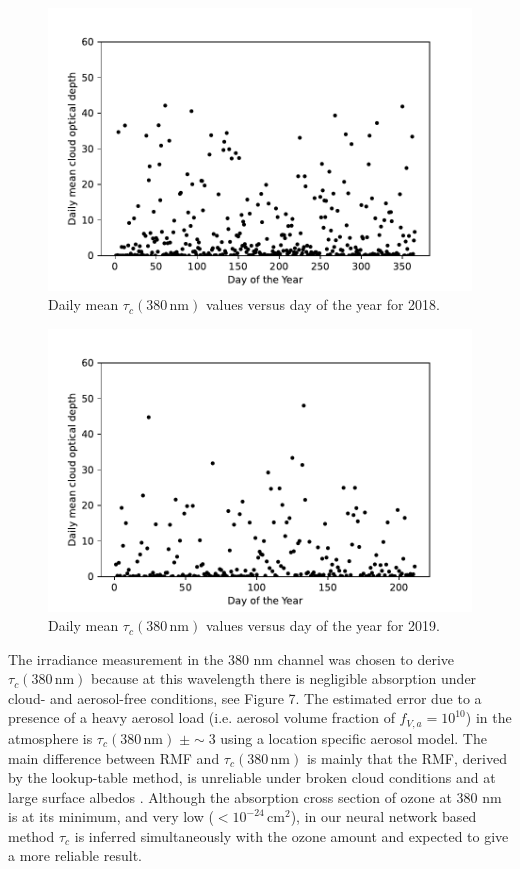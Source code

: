 \documentclass{optica-article}
\begin{document}
\begin{figure}[H]
	\centering
	\includegraphics[width=0.7\linewidth]{COD_vs_DOY_2018}
	\caption{Daily mean $\tau_c{\scriptstyle(380 \, \text{nm})}$ values versus day of the year for 2018.}
	\label{fig:codvsdoy2018}
\end{figure}


\begin{figure}[H]
	\centering
	\includegraphics[width=0.7\linewidth]{COD_vs_DOY_2019}
	\caption{Daily mean $\tau_c{\scriptstyle(380 \, \text{nm})}$ values versus day of the year for 2019.}
	\label{fig:codvsdoy2019}
\end{figure}

The irradiance measurement in the 380 nm channel was chosen to derive $\tau_c{\scriptstyle(380 \, \text{nm})}$ because at this wavelength there is negligible absorption under cloud- and aerosol-free conditions, see \cite{Sztipanov:2023} Figure 7. 
The estimated error due to a presence of a heavy aerosol load (i.e. aerosol volume fraction of ${f_{V,a}} =  10^{10}$) in the atmosphere is $\tau_c(380 \, \text{nm})\; \pm \sim 3$ using a location specific aerosol model.
The main difference between RMF and $\tau_c{\scriptstyle(380 \, \text{nm})}$ is mainly that the RMF, derived by the lookup-table method, is unreliable under broken cloud conditions and at large surface albedos \cite{Hoiskar2003}. 
Although the absorption cross section of ozone at 380 nm is at its minimum, and very low ($ < 10^{-24} \, \text{cm}^2$), in our neural network based method $\tau_c$ is inferred simultaneously with the ozone amount and expected to give a more reliable result. 
\end{document}
